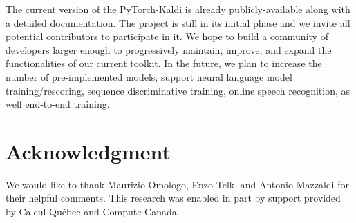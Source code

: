 \documentclass{article}
\begin{document}
The current version of the PyTorch-Kaldi is already publicly-available along with a detailed documentation. The project is still in its initial phase and we invite all potential contributors to participate in it. We hope to build a community of developers larger enough to progressively maintain, improve, and expand the functionalities of our current toolkit. In the future, we plan to increase the number of pre-implemented models, support neural language model training/rescoring, sequence discriminative training, online speech recognition, as well end-to-end training.

\section{Acknowledgment}
We would like to thank Maurizio Omologo, Enzo Telk, and Antonio Mazzaldi for their helpful comments.
This research was enabled in part by support provided by Calcul Qu\'ebec and Compute Canada.



\end{document}
